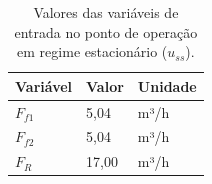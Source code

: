 \begin{table}[h]
  \caption{Valores das variáveis de entrada no ponto de operação em regime estacionário ($u_{ss}$).}
  \label{tab:u_ss}
  \centering
  \begin{tabular}{lll}
    \hline
    Variável & Valor   & Unidade \\
    \hline
    $F_{f1}$ & 5{,}04  & m³/h    \\
    $F_{f2}$ & 5{,}04  & m³/h    \\
    $F_R$    & 17{,}00 & m³/h    \\
    \hline
  \end{tabular}
\end{table}
